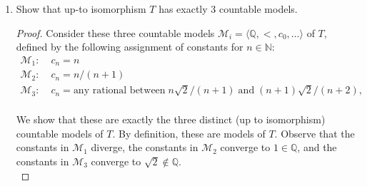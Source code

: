\documentclass{article}
\begin{document}
\begin{enumerate}[label={\bf Q\arabic*:}]
\begin{enumerate}
\begin{proof}
          Now we prove that $T$ is complete. Assume by contradiction that
          it is not. Then there is a sentence $\varphi(c_1,\ldots,c_n)$ in
          language $\mathcal{L}$ and models $\mathcal{M}$ and $\mathcal{N}$
          of $T$ such that $\mathcal{M}\models\varphi(c_1,\ldots,c_n)$ but
          $\mathcal{N}\models\neg\varphi(c_1,\ldots,c_n)$. Note that the
          sentence $\varphi(c_1,\ldots,c_n)$ cannot be a sentence in the
          reduced language $\mathcal{L}'$ because $\mathcal{M}$ and
          $\mathcal{N}$ are also models of $T'$ and $T'$ is a complete
          theory. Now from the claim in the above paragraph,
          $\mathcal{M}\models\varphi(c_1,\ldots,c_n)$ implies
          $\mathcal{M}\models\phi$, where $\phi$ is defined as
          \begin{align*}
            \phi:= \forall x_1,\ldots,x_n\;\;
              x_1<\ldots<x_n\rightarrow\varphi(x_1,\ldots,x_n).
          \end{align*}
          Then $\phi$ is a sentence in the reduced language $\mathcal{L}'$,
          so by completeness of $T'$ and from the fact that $\mathcal{N}$
          is also a model of $T'$ in the reduced language, $\phi$ must also
          be true in $\mathcal{N}$. This would contradict
          $\mathcal{N}\models\neg\varphi(c_1,\ldots,c_n)$.
        \end{proof}

      \item Show that up-to isomorphism $T$ has exactly 3 countable models.
        \begin{proof}
          Consider these three countable models
          $\mathcal{M}_i=\langle\mathbb{Q},<,c_0,\ldots\rangle$ of $T$,
          defined by the following assignment of constants for
          $n\in\mathbb{N}$:
          \begin{align*}
            \mathcal{M}_1:\;  &c_n = n & \\
            \mathcal{M}_2:\;  &c_n = n/(n+1) & \\
            \mathcal{M}_3:\;  &c_n = \text{any rational between}\;
              n\sqrt{2}/(n+1)\; \text{and}\; (n+1)\sqrt{2}/(n+2), & \\
          \end{align*}

          We show that these are exactly the three distinct (up to
          isomorphism) countable models of $T$. By definition, these are
          models of $T$. Observe that the constants in $\mathcal{M}_1$
          diverge, the constants in $\mathcal{M}_2$ converge to
          $1\in\mathbb{Q}$, and the constants in $\mathcal{M}_3$ converge
          to $\sqrt{2}\not\in\mathbb{Q}$. \\


\end{proof}
\end{enumerate}
\end{enumerate}
\end{document}
